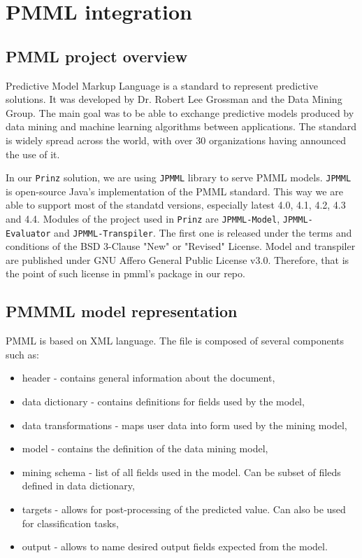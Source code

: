 \chapter{PMML integration}
\label{chap:pmml}

\section{PMML project overview}

Predictive Model Markup Language is a standard to represent predictive solutions.
It was developed by Dr. Robert Lee Grossman and the Data Mining Group.
The main goal was to be able to exchange predictive models produced by data mining
and machine learning algorithms between applications. The standard is widely spread across the world,
with over 30 organizations having announced the use of it.\cite{dmgpage}\cite{pmmlpowered}

In our \texttt{Prinz} solution, we are using \texttt{JPMML} library to serve PMML models. \texttt{JPMML} is open-source Java's
implementation of the PMML standard. This way we are able to support most of the standatd versions, especially latest
4.0, 4.1, 4.2, 4.3 and 4.4. Modules of the project used in \texttt{Prinz} are \texttt{JPMML-Model},
\texttt{JPMML-Evaluator} and \texttt{JPMML-Transpiler}. The first one is released under the terms and conditions
of the BSD 3-Clause "New" or "Revised" License. Model and transpiler are published under GNU Affero General Public License v3.0.
Therefore, that is the point of such license in pmml's package in our repo.\cite{jpmml}


\section{PMMML model representation}

PMML is based on XML language. The file is composed of several components such as:
\begin{itemize}
    \item header - contains general information about the document,
    \item data dictionary - contains definitions for fields used by the model,
    \item data transformations - maps user data into form used by the mining model,
    \item model - contains the definition of the data mining model,
    \item mining schema - list of all fields used in the model. Can be subset of fileds defined in data dictionary,
    \item targets - allows for post-processing of the predicted value. Can also be used for classification tasks,
    \item output - allows to name desired output fields expected from the model.
\end{itemize}


